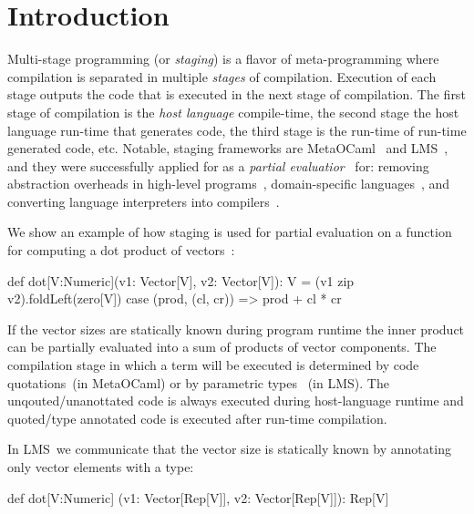 \section{Introduction}
\label{sct:introduction}


 Multi-stage programming (or \emph{staging}) is a flavor of meta-programming where compilation is
  separated in multiple \emph{stages} of compilation. Execution of each stage outputs
  the code that is executed in the next stage of compilation. The first stage of
  compilation is the \emph{host language} compile-time, the second stage the host language
  run-time that generates code, the third stage is the run-time of run-time generated code, etc.
  Notable, staging frameworks are MetaOCaml~\cite{taha_multi-stage_1997} and LMS~\cite{rompf2012lightweight},
  and they were successfully applied for as a \emph{partial evaluatior}~\cite{jones1993partial} for:
  removing abstraction overheads in high-level programs~\cite{carette2005multi,rompf2012lightweight},
  domain-specific languages~\cite{jonnalagedda2014staged}, and converting language
  interpreters into compilers~\cite{lancet}.

 We show an example of how staging is used for partial evaluation on a function
 for computing a dot product of vectors~\footnotemark[1]:\begin{lstparagraph}
  def dot[V:Numeric](v1: Vector[V], v2: Vector[V]): V =
    (v1 zip v2).foldLeft(zero[V]) {
      case (prod, (cl, cr)) => prod + cl * cr
    }
 \end{lstparagraph}

If the vector sizes are statically known during program runtime the inner product can
 be partially evaluated into a sum of products of vector components. The compilation stage in which a term will be executed is determined by code quotations~(in MetaOCaml) or by parametric types ~(in LMS). The
 unqouted/unanottated code is always executed during host-language runtime and
 quoted/type annotated code is executed after run-time compilation.


 In LMS~\footnotemark[2] we communicate that the vector size is statically known
  by annotating only vector elements with a  type:\begin{lstparagraph}
  def dot[V:Numeric]
    (v1: Vector[Rep[V]], v2: Vector[Rep[V]]): Rep[V]
 \end{lstparagraph}


